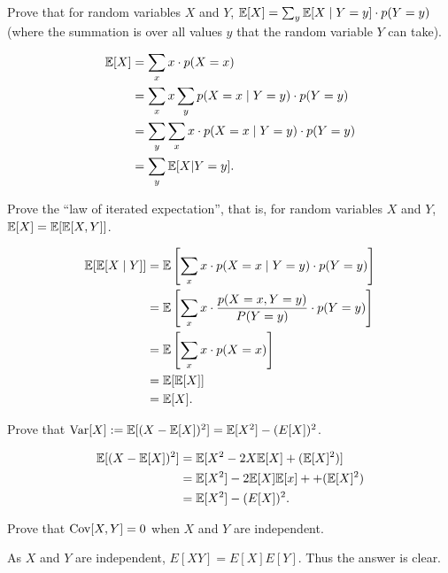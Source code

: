 \question Prove that for random variables $X$ and $Y$, $\mathbb E[X] = \sum_y \mathbb E[X \mid Y = y] \cdot p(Y = y)$ (where the summation is over all values $y$ that the random variable $Y$ can take).

\begin{solution}
    \begin{align*}
        \mathbb E[X] & = \sum_x x \cdot p(X = x)                                  \\
              & = \sum_x x \sum_y p(X = x \mid Y = y) \cdot p(Y = y)       \\
              & = \sum_y \sum_x x \cdot p(X = x \mid Y = y) \cdot p(Y = y) \\
              & = \sum_y \mathbb E[X | Y = y].                                    \\
    \end{align*}
\end{solution}

\question Prove the ``law of iterated expectation'', that is, for random variables $X$ and $Y$, $\mathbb E[X] = \mathbb E[\mathbb E[X,Y]]$.

\begin{solution}
    \begin{align*}
        \mathbb E[\mathbb E[X \mid Y]] & = \mathbb E\left[\sum_x x \cdot p(X = x \mid Y = y) \cdot p(Y = y)\right]              \\
                         & = \mathbb E\left[\sum_x x \cdot \frac{p(X = x, Y = y)}{P(Y = y)} \cdot p(Y = y)\right] \\
                         & = \mathbb E\left[\sum_x x \cdot p(X = x) \right]                                       \\
                         & = \mathbb E[\mathbb E[X]]                                                                     \\
                         & = \mathbb E[X].
    \end{align*}
\end{solution}

\question Prove that $\operatorname{Var}[X] := \mathbb E[(X - \mathbb E[X])^2] = \mathbb E[X^2] - (E[X])^2$.

\begin{solution}
    \begin{align*}
        \mathbb E[(X - \mathbb E[X])^2] & = \mathbb E[X^2 - 2X\mathbb E[X] + (\mathbb E[X]^2)]        \\
                          & = \mathbb E[X^2] - 2\mathbb E[X]\mathbb E[x] + + (\mathbb E[X]^2) \\
                          & = \mathbb E[X^2] - (E[X])^2.
    \end{align*}
\end{solution}

\question Prove that $\operatorname{Cov}[X,Y] = 0$ when $X$ and $Y$ are independent.

\begin{solution}
    As $X$ and $Y$ are independent, $E[XY] = E[X]E[Y]$. Thus the answer is clear.
\end{solution}